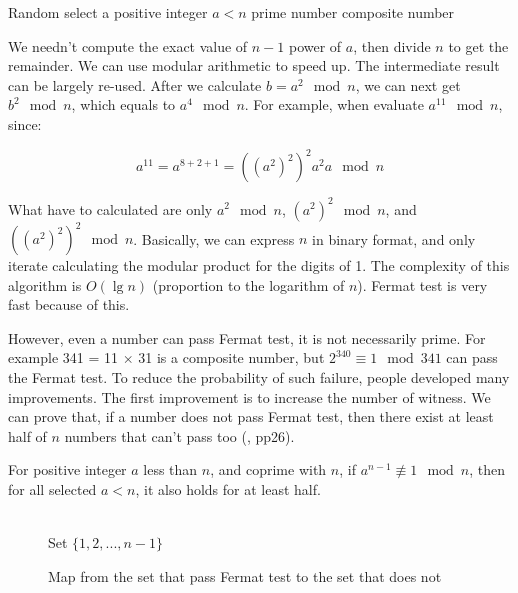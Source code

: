 \documentclass[b5paper]{article}
\begin{document}
\begin{algorithmic}
  \State Random select a positive integer $a < n$
    \State \Return prime number
  \Else
    \State \Return composite number
  \EndIf
\EndFunction
\end{algorithmic}

We needn't compute the exact value of $n-1$ power of $a$, then divide $n$ to get the remainder. We can use modular arithmetic to speed up. The intermediate result can be largely re-used. After we calculate $b = a^2 \mod n$, we can next get $b^2 \mod n$, which equals to $a^4 \mod n$. For example, when evaluate $a^{11} \mod n$, since:

\[
a^{11} = a^{8 + 2 + 1} = ((a^2)^2)^2a^2a \mod n
\]

What have to calculated are only $a^2 \mod n$, $(a^2)^2 \mod n$, and $((a^2)^2)^2 \mod n$. Basically, we can express $n$ in binary format, and only iterate calculating the modular product for the digits of 1. The complexity of this algorithm is $O(\lg n)$ (proportion to the logarithm of $n$). Fermat test is very fast because of this.

However, even a number can pass Fermat test, it is not necessarily prime. For example 341 = 11 $\times$ 31 is a composite number, but $2^{340} \equiv 1 \mod 341$ can pass the Fermat test. To reduce the probability of such failure, people developed many improvements. The first improvement is to increase the number of witness. We can prove that, if a number does not pass Fermat test, then there exist at least half of $n$ numbers that can't pass too (\cite{Algorithms-DPV}, pp26).

\begin{theorem}
For positive integer $a$ less than $n$, and coprime with $n$, if $a^{n-1} \not\equiv 1 \mod n$, then for all selected $a < n$, it also holds for at least half.
\end{theorem}

\begin{figure}[htbp]
\centering
{} \\
Set $\{1, 2, ..., n-1\}$
\caption{Map from the set that pass Fermat test to the set that does not}
\label{fig:Fermat-test}
\end{figure}
\end{document}
